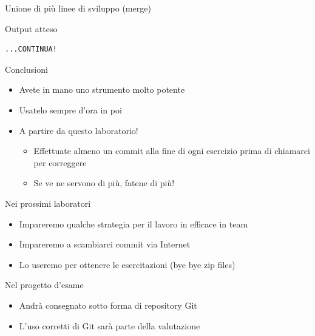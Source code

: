 \documentclass[xcolor=dvipsnames,presentation]{beamer}
\begin{document}
\begin{frame}{Unione di più linee di sviluppo (merge)}
\begin{block}{Output atteso}
\begin{Verbatim}[fontsize=\tiny]
...CONTINUA!
        \end{Verbatim}
    \end{block}
\end{frame}

\begin{frame}{Conclusioni}
    \begin{itemize}
        \item Avete in mano uno strumento molto potente
        \item Usatelo sempre d'ora in poi
        \item A partire da questo laboratorio!
        \begin{itemize}
            \item Effettuate almeno un commit alla fine di ogni esercizio prima di chiamarci per correggere
            \item Se ve ne servono di più, fatene di più!
        \end{itemize}
    \end{itemize}
    \begin{block}{Nei prossimi laboratori}
        \begin{itemize}
            \item Impareremo qualche strategia per il lavoro in efficace in team
            \item Impareremo a scambiarci commit via Internet
            \item Lo useremo per ottenere le esercitazioni (bye bye zip files)
        \end{itemize}
    \end{block}
    \begin{block}{Nel progetto d'esame}
        \begin{itemize}
            \item Andrà consegnato sotto forma di repository Git
            \item L'uso corretti di Git sarà parte della valutazione
        \end{itemize}
    \end{block}
\end{frame}
\end{document}
